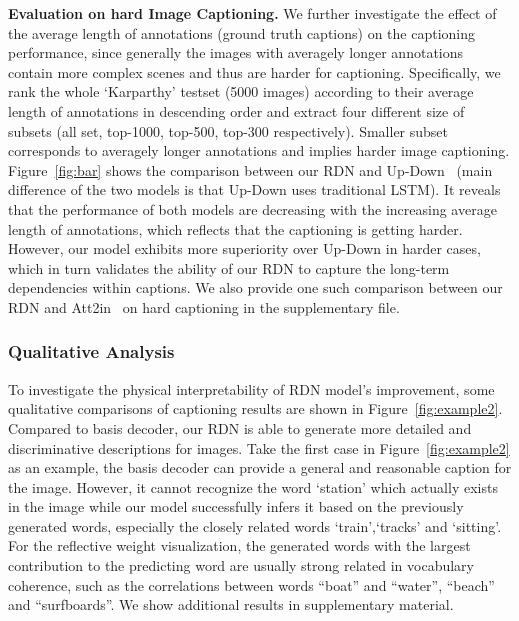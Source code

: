 \documentclass[10pt,twocolumn,letterpaper]{article}
\begin{document}
\vspace{-0.04in}
\smallskip\noindent\textbf{Evaluation on hard Image Captioning.}
We further investigate the effect of the average length of annotations (ground truth captions) on the captioning performance, since generally the images with averagely longer annotations contain more complex scenes and thus are harder for captioning.
Specifically, we rank the whole `Karparthy' testset (5000 images) according to their average length of annotations in descending order and extract four different size of subsets (all set, top-1000, top-500, top-300 respectively). Smaller subset corresponds to averagely longer annotations and implies harder image captioning. Figure~\ref{fig:bar} shows the comparison between our RDN and Up-Down~\cite{anderson2017bottom} (main difference of the two models is that Up-Down uses traditional LSTM). 
It reveals that the performance of both models are decreasing with the increasing average length of annotations, which reflects that the captioning is getting harder. However, our model exhibits more superiority over Up-Down in harder cases, which in turn validates the ability of our RDN to capture the long-term dependencies within captions.
We also provide one such comparison between our RDN and Att2in~\cite{rennie2017self} on hard captioning in the supplementary file.




\vspace{-0.15in}
\subsubsection{Qualitative Analysis}
\label{sec:qualitative_analysis}
To investigate the physical interpretability of RDN model's improvement, some qualitative comparisons of captioning results are shown in Figure~\ref{fig:example2}. 
Compared to basis decoder, our RDN is able to generate more detailed and discriminative descriptions for images.
Take the first case in Figure~\ref{fig:example2} as an example, the basis decoder can provide a general and reasonable caption for the image.
However, it cannot recognize the word `station' which actually exists in the image while our model successfully infers it based on the previously generated words, especially the closely related words `train',`tracks' and `sitting'.
For the reflective weight visualization, the generated words with the largest contribution to the predicting word are usually strong related in vocabulary coherence, such as the correlations between words ``boat'' and ``water'', ``beach'' and ``surfboards''.
We show additional results in supplementary material.
\vspace{0.02in}
\end{document}
